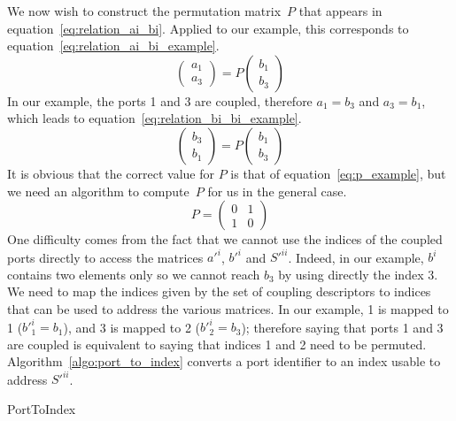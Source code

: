 We now wish to construct the permutation matrix~$P$ that appears in equation~\eqref{eq:relation_ai_bi}.
Applied to our example, this corresponds to equation~\eqref{eq:relation_ai_bi_example}.
\begin{equation}
    \begin{pmatrix}
        a_1 \\ a_3
    \end{pmatrix}
    =
    P
    \begin{pmatrix}
        b_1 \\ b_3
    \end{pmatrix}
    \label{eq:relation_ai_bi_example}
\end{equation}
In our example, the ports 1 and 3 are coupled, therefore $a_1 = b_3$ and $a_3 = b_1$, which leads to equation~\eqref{eq:relation_bi_bi_example}.
\begin{equation}
    \begin{pmatrix}
        b_3 \\ b_1
    \end{pmatrix}
    =
    P
    \begin{pmatrix}
        b_1 \\ b_3
    \end{pmatrix}
    \label{eq:relation_bi_bi_example}
\end{equation}
It is obvious that the correct value for $P$ is that of equation~\eqref{eq:p_example}, but we need an algorithm to compute~$P$ for us in the general case.
\begin{equation}
    P =
    \begin{pmatrix}
        0 & 1 \\
        1 & 0
    \end{pmatrix}
    \label{eq:p_example}
\end{equation}
One difficulty comes from the fact that we cannot use the indices of the coupled ports directly to access the matrices $a'^i$, $b'^i$ and $S'^{ii}$.
Indeed, in our example, $b^i$ contains two elements only so we cannot reach $b_3$ by using directly the index 3.
We need to map the indices given by the set of coupling descriptors to indices that can be used to address the various matrices.
In our example, 1 is mapped to 1 ($b'^i_1 = b_1$), and 3 is mapped to 2 ($b'^i_2 = b_3$); therefore saying that ports 1 and 3 are coupled is equivalent to saying that indices 1 and 2 need to be permuted.
Algorithm~\ref{algo:port_to_index} converts a port identifier to an index usable to address $S'^{ii}$.
\begin{algorithm}
    \caption{PortToIndex}
    \label{algo:port_to_index}
    \begin{algorithmic}
         
         
    \end{algorithmic}
\end{algorithm}

